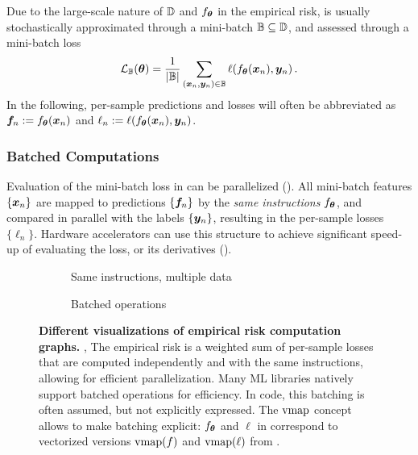 Due to the large-scale nature of ${\mathbb{D}}$ and $f_{{\bm{\theta}}}$ in the empirical risk,
 is usually stochastically approximated
through a mini-batch ${\mathbb{B}} \subseteq {\mathbb{D}}$, and assessed through a mini-batch loss
\begin{equation}
  \label{eq:background::miniBatchRisk}
  {\mathcal{L}}_{{\mathbb{B}}}({\bm{\theta}})
  =
  \frac{1}{|{\mathbb{B}}|}
  \sum_{({\bm{x}}_n, {\bm{y}}_n) \in {\mathbb{B}}}
  \ell(f_{{\bm{\theta}}}({\bm{x}}_n), {\bm{y}}_n)\,.
\end{equation}
In the following, per-sample predictions and losses will often be abbreviated as
${\bm{f}}_n := f_{{\bm{\theta}}}({\bm{x}}_n)$ and $\ell_n := \ell(f_{{\bm{\theta}}}({\bm{x}}_n), {\bm{y}}_n)$.

\subsubsection{Batched Computations}

Evaluation of the mini-batch loss in  can be
parallelized (). All mini-batch
features $\{ {\bm{x}}_n \}$ are mapped to predictions $\{ {\bm{f}}_n \}$ by the \emph{same
  instructions $f_{{\bm{\theta}}}$}, and compared in parallel with the labels $\{
{\bm{y}}_n \}$, resulting in the per-sample losses $\{ \ell_n\}$. Hardware
accelerators can use this structure to achieve significant speed-up of
evaluating the loss, or its derivatives
().

\begin{figure*}[t]
  \centering
  \begin{subfigure}[t]{0.495\linewidth}
    \centering
    \caption{Same instructions, multiple data}
    \label{subfig:background::BatchedComputation1}
    \tikzexternalenable
    \resizebox{!}{3.5cm}{}
    \tikzexternaldisable
  \end{subfigure}
  \hfill
  \begin{subfigure}[t]{0.495\linewidth}
    \centering
    \caption{Batched operations}
    \label{subfig:background::BatchedComputation2}
    \tikzexternalenable
    \resizebox{!}{3.5cm}{}
    \tikzexternaldisable
  \end{subfigure}
  \caption{\textbf{Different visualizations of empirical risk computation
      graphs.} , The empirical
    risk is a weighted sum of per-sample losses that are computed independently
    and with the same instructions, allowing for efficient parallelization.
     Many ML libraries
    natively support batched operations for efficiency. In code, this batching
    is often assumed, but not explicitly expressed. The $\operatorname{vmap}$ concept allows
    to make batching explicit: $f_{{\bm{\theta}}}$ and $\ell$ in
     correspond to vectorized
    versions $\operatorname{vmap}(f)$ and $\operatorname{vmap}(\ell)$ from
    .}
  \label{fig:background::BatchedComputation}
\end{figure*}


